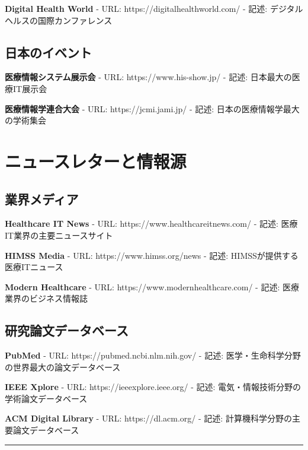 \documentclass[
  a4paper,
  a4paper,
  11pt]{ltjsbook}
\begin{document}
\textbf{Digital Health World} - URL: https://digitalhealthworld.com/ -
記述: デジタルヘルスの国際カンファレンス

\subsection{日本のイベント}\label{ux65e5ux672cux306eux30a4ux30d9ux30f3ux30c8}

\textbf{医療情報システム展示会} - URL: https://www.his-show.jp/ - 記述:
日本最大の医療IT展示会

\textbf{医療情報学連合大会} - URL: https://jcmi.jami.jp/ - 記述:
日本の医療情報学最大の学術集会

\section{ニュースレターと情報源}\label{ux30cbux30e5ux30fcux30b9ux30ecux30bfux30fcux3068ux60c5ux5831ux6e90}

\subsection{業界メディア}\label{ux696dux754cux30e1ux30c7ux30a3ux30a2}

\textbf{Healthcare IT News} - URL: https://www.healthcareitnews.com/ -
記述: 医療IT業界の主要ニュースサイト

\textbf{HIMSS Media} - URL: https://www.himss.org/news - 記述:
HIMSSが提供する医療ITニュース

\textbf{Modern Healthcare} - URL: https://www.modernhealthcare.com/ -
記述: 医療業界のビジネス情報誌

\subsection{研究論文データベース}\label{ux7814ux7a76ux8ad6ux6587ux30c7ux30fcux30bfux30d9ux30fcux30b9}

\textbf{PubMed} - URL: https://pubmed.ncbi.nlm.nih.gov/ - 記述:
医学・生命科学分野の世界最大の論文データベース

\textbf{IEEE Xplore} - URL: https://ieeexplore.ieee.org/ - 記述:
電気・情報技術分野の学術論文データベース

\textbf{ACM Digital Library} - URL: https://dl.acm.org/ - 記述:
計算機科学分野の主要論文データベース

\begin{center}\rule{0.5\linewidth}{0.5pt}\end{center}
\end{document}
